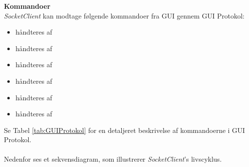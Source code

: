 \textbf{Kommandoer}\\

\textit{SocketClient} kan modtage følgende kommandoer fra GUI gennem GUI Protokol:

\begin{itemize}
\item {} håndteres af 
\item {} håndteres af 
\item {} håndteres af 
\item {} håndteres af 
\item {} håndteres af 
\item {} håndteres af 
\end{itemize}

Se Tabel \ref{tab:GUIProtokol} for en detaljeret beskrivelse af kommandoerne i GUI Protokol.\\\\

Nedenfor ses et sekvensdiagram, som illustrerer \textit{SocketClient}'s livscyklus.


